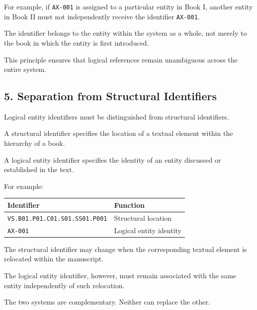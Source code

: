 For example, if \texttt{AX-001} is
assigned to a particular entity in
Book I, another entity in Book II
must not independently receive
the identifier \texttt{AX-001}.

The identifier belongs to the entity
within the system as a whole, not
merely to the book in which the entity
is first introduced.

This principle ensures that logical
references remain unambiguous across
the entire system.


\subsection*{5. Separation from Structural
Identifiers}

Logical entity identifiers must be
distinguished from structural identifiers.

A structural identifier specifies
the location of a textual element
within the hierarchy of a book.

A logical entity identifier specifies
the identity of an entity discussed
or established in the text.

For example:

\begin{center}
\begin{tabular}{ll}
    \toprule
    \textbf{Identifier} & \textbf{Function} \\
    \midrule
    \texttt{VS.B01.P01.C01.S01.SS01.P001}
        & Structural location \\
    \texttt{AX-001}
        & Logical entity identity \\
    \bottomrule
\end{tabular}
\end{center}

The structural identifier may change
when the corresponding textual element
is relocated within the manuscript.

The logical entity identifier, however,
must remain associated with the same
entity independently of such relocation.

The two systems are complementary.
Neither can replace the other.


